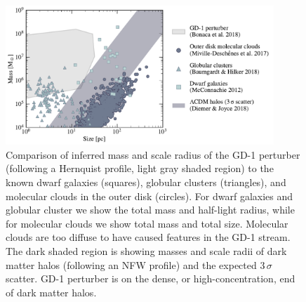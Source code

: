\documentclass[twocolumn]{aastex62}
\begin{document}

\begin{figure}
\begin{center}
\includegraphics[width=0.9\textwidth]{mass_size.pdf}
\end{center}
\caption{Comparison of inferred mass and scale radius of the GD-1 perturber (following a Hernquist profile, light gray shaded region) to the known dwarf galaxies (squares), globular clusters (triangles), and molecular clouds in the outer disk (circles).
For dwarf galaxies and globular cluster we show the total mass and half-light radius, while for molecular clouds we show total mass and total size.
Molecular clouds are too diffuse to have caused features in the GD-1 stream.
The dark shaded region is showing masses and scale radii of dark matter halos (following an NFW profile) and the expected $3\,\sigma$ scatter.
GD-1 perturber is on the dense, or high-concentration, end of dark matter halos.
}
\label{fig:mass_size}
\end{figure}
\end{document}
